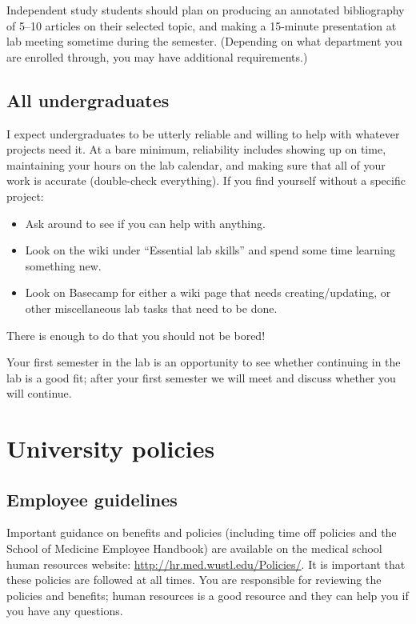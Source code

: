 \documentclass[letterpaper,12pt,oneside]{memoir}
\begin{document}
Independent study students should plan on producing an annotated bibliography of 5--10 articles on their selected topic, and making a 15-minute presentation at lab meeting sometime during the semester. (Depending on what department you are enrolled through, you may have additional requirements.)



\subsection{All undergraduates}

I expect undergraduates to be utterly reliable and willing to help with whatever projects need it. At a bare minimum, reliability includes showing up on time, maintaining your hours on the lab calendar, and making sure that all of your work is accurate (double-check everything). If you find yourself without a specific project:

\begin{itemize}
\item Ask around to see if you can help with anything.
\item Look on the wiki under ``Essential lab skills'' and spend some time learning something new.
\item Look on Basecamp for either a wiki page that needs creating/updating, or other miscellaneous lab tasks that need to be done.
\end{itemize}

There is enough to do that you should not be bored!

Your first semester in the lab is an opportunity to see whether continuing in the lab is a good fit; after your first semester we will meet and discuss whether you will continue.

\section{University policies}

\subsection{Employee guidelines}
Important guidance on benefits and policies (including time off policies and the School of Medicine Employee Handbook) are available on the medical school human resources website: \url{http://hr.med.wustl.edu/Policies/}. It is important that these policies are followed at all times. You are responsible for reviewing the policies and benefits; human resources is a good resource and they can help you if you have any questions.
\end{document}
